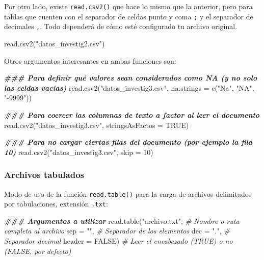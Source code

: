 \documentclass[
]{article}
\newenvironment{Shaded}{\begin{snugshade}}{\end{snugshade}}
\newcommand{\AttributeTok}[1]{\textcolor[rgb]{0.77,0.63,0.00}{#1}}
\newcommand{\CommentTok}[1]{\textcolor[rgb]{0.56,0.35,0.01}{\textit{#1}}}
\newcommand{\ConstantTok}[1]{\textcolor[rgb]{0.00,0.00,0.00}{#1}}
\newcommand{\DecValTok}[1]{\textcolor[rgb]{0.00,0.00,0.81}{#1}}
\newcommand{\DocumentationTok}[1]{\textcolor[rgb]{0.56,0.35,0.01}{\textbf{\textit{#1}}}}
\newcommand{\FunctionTok}[1]{\textcolor[rgb]{0.00,0.00,0.00}{#1}}
\newcommand{\NormalTok}[1]{#1}
\newcommand{\StringTok}[1]{\textcolor[rgb]{0.31,0.60,0.02}{#1}}
\theoremstyle{definition}
\theoremstyle{definition}
\theoremstyle{definition}
\theoremstyle{definition}
\theoremstyle{remark}
\begin{document}
Por otro lado, existe \texttt{read.csv2()} que hace lo mismo que la anterior, pero para tablas que cuenten con el separador de celdas punto y coma \texttt{;} y el separador de decimales \texttt{,}. Todo dependerá de cómo esté configurado tu archivo original.

\begin{Shaded}
\begin{Highlighting}[]
\FunctionTok{read.csv2}\NormalTok{(}\StringTok{"datos\_investig2.csv"}\NormalTok{)}
\end{Highlighting}
\end{Shaded}

Otros argumentos interesantes en ambas funciones son:

\begin{Shaded}
\begin{Highlighting}[]
\DocumentationTok{\#\#\# Para definir qué valores sean considerados como NA (y no solo las celdas vacías)}
\FunctionTok{read.csv2}\NormalTok{(}\StringTok{"datos\_investig3.csv"}\NormalTok{, }\AttributeTok{na.strings =} \FunctionTok{c}\NormalTok{(}\StringTok{"Na"}\NormalTok{, }\StringTok{"NA"}\NormalTok{, }\StringTok{"{-}9999"}\NormalTok{))}

\DocumentationTok{\#\#\# Para coercer las columnas de texto a factor al leer el documento}
\FunctionTok{read.csv2}\NormalTok{(}\StringTok{"datos\_investig3.csv"}\NormalTok{, }\AttributeTok{stringsAsFactos =} \ConstantTok{TRUE}\NormalTok{)}

\DocumentationTok{\#\#\# Para no cargar ciertas filas del documento (por ejemplo la fila 10)}
\FunctionTok{read.csv2}\NormalTok{(}\StringTok{"datos\_investig3.csv"}\NormalTok{, }\AttributeTok{skip =} \DecValTok{10}\NormalTok{)}
\end{Highlighting}
\end{Shaded}

\hypertarget{archivos-tabulados}{%
\subsubsection{Archivos tabulados}\label{archivos-tabulados}}

Modo de uso de la función \texttt{read.table()} para la carga de archivos delimitados por tabulaciones, extensión \texttt{.txt}:

\begin{Shaded}
\begin{Highlighting}[]
\DocumentationTok{\#\#\# Argumentos a utilizar}
\FunctionTok{read.table}\NormalTok{(}\StringTok{"archivo.txt"}\NormalTok{, }\CommentTok{\# Nombre o ruta completa al archivo}
         \AttributeTok{sep =} \StringTok{""}\NormalTok{,        }\CommentTok{\# Separador de los elementos}
         \AttributeTok{dec =} \StringTok{"."}\NormalTok{,       }\CommentTok{\# Separador decimal}
         \AttributeTok{header =} \ConstantTok{FALSE}\NormalTok{)   }\CommentTok{\# Leer el encabezado (TRUE) o no (FALSE, por defecto)}
\end{Highlighting}
\end{Shaded}
\end{document}
